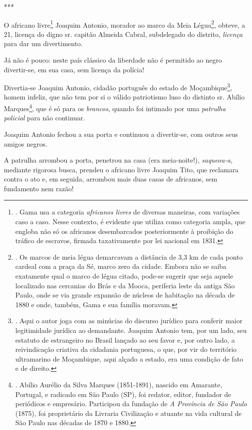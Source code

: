 ***

O africano livre\footnote{. Gama usa a categoria \emph{africanos livres}
  de diversas maneiras, com variações caso a caso. Nesse contexto, é
  evidente que utiliza como categoria ampla, que engloba não só os
  africanos desembarcados posteriormente à proibição do tráfico de
  escravos, firmada taxativamente por lei nacional em 1831.} Joaquim
Antonio, morador ao marco da Meia Légua\footnote{. Os marcos de meia
  légua demarcavam a distância de 3,3 km de cada ponto cardeal com a
  praça da Sé, marco zero da cidade. Embora não se saiba exatamente qual
  o marco de légua citado, pode-se sugerir que seja aquele localizado
  nas cercanias do Brás e da Mooca, periferia leste da antiga São Paulo,
  onde se via grande expansão de núcleos de habitação na década de 1880
  e onde, também, Gama e sua família moravam.}, obteve, a 21, licença do
digno sr. capitão Almeida Cabral, subdelegado do distrito,
\emph{licença} para dar um divertimento.

Já não é pouco: neste país clássico da liberdade não é permitido ao
negro divertir-se, em sua casa, sem licença da polícia!

Divertia-se Joaquim Antonio, cidadão português do estado de
Moçambique\footnote{. Aqui o autor joga com as minúcias do discurso
  jurídico para conferir maior legitimidade jurídica ao demandante.
  Joaquim Antonio tem, por um lado, seu estatuto de estrangeiro no
  Brasil lançado ao seu favor e, por outro lado, a reivindicação
  criativa da cidadania portuguesa, o que, por vir do território
  ultramarino de Moçambique, aqui alçado a estado, era uma condição de
  fato e de direito.}, homem infeliz, que não tem por si o válido
patriotismo luso do distinto sr. Abílio Marques\footnote{. Abílio
  Aurélio da Silva Marques (1851-1891), nascido em Amarante, Portugal, e
  radicado em São Paulo (SP), foi redator, editor, fundador de
  periódicos e empresário. Participou da fundação de \emph{A Província
  de São Paulo} (1875), foi proprietário da Livraria Civilização e
  atuante na vida cultural de São Paulo nas décadas de 1870 e 1880.},
que é só para os
\emph{brancos}, quando foi intimado por uma \emph{patrulha policial}
para não continuar.

Joaquim Antonio fechou a sua porta e continuou a divertir-se, com outros
seus amigos negros.

A patrulha arrombou a porta, penetrou na casa (era meia-noite!),
\emph{saqueou-a}, mediante rigorosa busca, prendeu o africano livre
Joaquim Tito, que reclamara contra o ato e, em seguida, arrombou mais
duas casas de africanos, sem fundamento nem razão!

